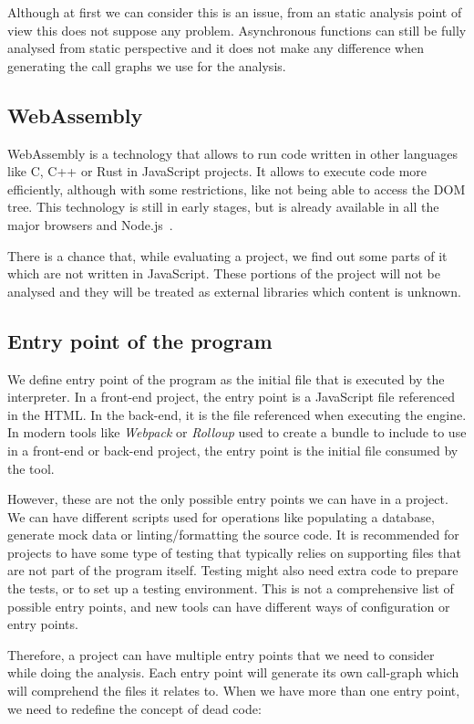 \documentclass{uvamscse}
\begin{document}
Although at first we can consider this is an issue, from an static analysis point of view this does not suppose any problem. Asynchronous functions can still be fully analysed from static perspective and it does not make any difference when generating the call graphs we use for the analysis.

\subsection{WebAssembly}
WebAssembly is a technology that allows to run code written in other languages like C, C++ or Rust in JavaScript projects. It allows to execute code more efficiently, although with some restrictions, like not being able to access the DOM tree. This technology is still in early stages, but is already available in all the major browsers and Node.js~\cite{WebAssembly}.

There is a chance that, while evaluating a project, we find out some parts of it which are not written in JavaScript. These portions of the project will not be analysed and they will be treated as external libraries which content is unknown.

\subsection{Entry point of the program}
We define entry point of the program as the initial file that is executed by the interpreter. In a front-end project, the entry point is a JavaScript file referenced in the HTML. In the back-end, it is the file referenced when executing the engine. In modern tools like \textit{Webpack} or \textit{Rolloup} used to create a bundle to include to use in a front-end or back-end project, the entry point is the initial file consumed by the tool.

However, these are not the only possible entry points we can have in a project. We can have different scripts used for operations like populating a database, generate mock data or linting/formatting the source code. It is recommended for projects to have some type of testing that typically relies on supporting files that are not part of the program itself. Testing might also need extra code to prepare the tests, or to set up a testing environment. This is not a comprehensive list of possible entry points, and new tools can have different ways of configuration or entry points.

Therefore, a project can have multiple entry points that we need to consider while doing the analysis. Each entry point will generate its own call-graph which will comprehend the files it relates to. When we have more than one entry point, we need to redefine the concept of dead code:
\end{document}
